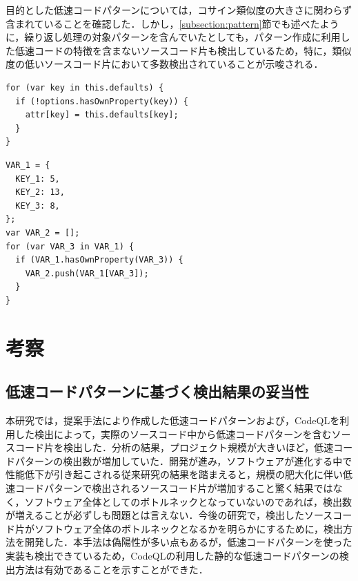 \documentclass[submit,techrep,noauthor]{ipsj}
\begin{document}
目的とした低速コードパターンについては，コサイン類似度の大きさに関わらず含まれていることを確認した．しかし，\ref{subsection:pattern}節でも述べたように，繰り返し処理の対象パターンを含んでいたとしても，パターン作成に利用した低速コードの特徴を含まないソースコード片も検出しているため，特に，類似度の低いソースコード片において多数検出されていることが示唆される．


\begin{lstlisting}[caption=実プロジェクト中の高類似度検出例, label=ID3_highcos, captionpos=t, columns=flexible]
for (var key in this.defaults) {
  if (!options.hasOwnProperty(key)) {
    attr[key] = this.defaults[key];
  }
}
\end{lstlisting}


\begin{lstlisting}[caption=マイクロベンチマーク中の高類似度検出例, label=MB_highcos, captionpos=t, columns=flexible]
VAR_1 = {
  KEY_1: 5,
  KEY_2: 13,
  KEY_3: 8,
};
var VAR_2 = [];
for (var VAR_3 in VAR_1) {
  if (VAR_1.hasOwnProperty(VAR_3)) {
    VAR_2.push(VAR_1[VAR_3]);
  }
}
\end{lstlisting}


\section{考察}
\label{sec:discussion}


\subsection{低速コードパターンに基づく検出結果の妥当性}

本研究では，提案手法により作成した低速コードパターンおよび，CodeQLを利用した検出によって，実際のソースコード中から低速コードパターンを含むソースコード片を検出した．分析の結果，プロジェクト規模が大きいほど，低速コードパターンの検出数が増加していた．開発が進み，ソフトウェアが進化する中で性能低下が引き起こされる従来研究\cite{emprical_perfomancebug}の結果を踏まえると，規模の肥大化に伴い低速コードパターンで検出されるソースコード片が増加すること驚く結果ではなく，ソフトウェア全体としてのボトルネックとなっていないのであれば，検出数が増えることが必ずしも問題とは言えない．今後の研究で，検出したソースコード片がソフトウェア全体のボトルネックとなるかを明らかにするために，検出方法を開発した．本手法は偽陽性が多い点もあるが，低速コードパターンを使った実装も検出できているため，CodeQLの利用した静的な低速コードパターンの検出方法は有効であることを示すことができた．
\end{document}
